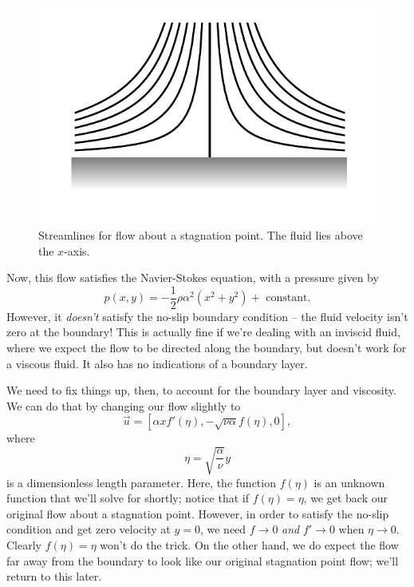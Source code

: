 \begin{figure}
\centering
\includegraphics[width=0.6\linewidth]{Figures/Chapter2/fig_boundary_stream}
\caption{Streamlines for flow about a stagnation point.  The fluid lies above the $x$-axis.}
\label{fig_boundary_stream}
\end{figure}


Now, this flow satisfies the Navier-Stokes equation, with a pressure given by
\begin{equation}
\label{eq_boundary_pressure}
p(x, y) = -\frac{1}{2} \rho \alpha^2 ( x^2 + y^2) + \text{ constant}.
\end{equation}
However, it \emph{doesn't} satisfy the no-slip boundary condition -- the fluid velocity isn't zero at the boundary!  This is actually fine if we're dealing with an inviscid fluid, where we expect the flow to be directed along the boundary, but doesn't work for a viscous fluid.  It also has no indications of a boundary layer.

We need to fix things up, then, to account for the boundary layer and viscosity.  We can do that by changing our flow slightly to
\begin{equation}
\label{eq_boundary_trial}
\vec{u} = [\alpha x f'(\eta), -\sqrt{\nu \alpha} f(\eta), 0],
\end{equation}
where
\[
\eta = \sqrt{ \frac{\alpha}{\nu}} y
\]
is a dimensionless length parameter.  Here, the function $f(\eta)$ is an unknown function that we'll solve for shortly; notice that if $f(\eta) = \eta$, we get back our original flow about a stagnation point.  However, in order to satisfy the no-slip condition and get zero velocity at $y=0$, we need $f \to 0$ \emph{and} $f' \to 0$ when $\eta \to 0$.  Clearly $f(\eta) = \eta$ won't do the trick.  On the other hand, we do expect the flow far away from the boundary to look like our original stagnation point flow; we'll return to this later.

